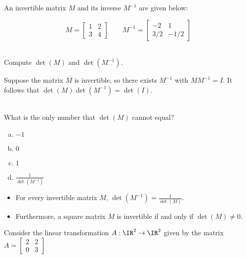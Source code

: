\begin{applicationActivities}

\begin{activity}{5}
  An invertible matrix \(M\) and its inverse \(M^{-1}\) are given below:

  \[
    M=\begin{bmatrix}1&2\\3&4\end{bmatrix}
  \hspace{2em}
    M^{-1}=\begin{bmatrix}-2&1\\3/2&-1/2\end{bmatrix}
  \]

\ \\

  Compute \(\det(M)\) and \(\det(M^{-1})\).
\end{activity}

\begin{activity}{5}
  Suppose the matrix \(M\) is invertible, so there exists \(M^{-1}\)
  with \(MM^{-1}=I\). It follows that \(\det(M)\det(M^{-1})=\det(I)\).

\ \\

  What is the only number that \(\det(M)\) cannot equal?
  \begin{multicols}{4}
  \begin{enumerate}[(a)]
  \item \(-1\)
  \item \(0\)
  \item \(1\)
  \item \(\frac{1}{\det(M^{-1})}\)
  \end{enumerate}
  \end{multicols}
\end{activity}

\begin{fact}
  \begin{itemize}
\item   For every invertible matrix \(M\),
  \(\det(M^{-1})=\frac{1}{\det(M)}\).

\item  Furthermore,
  a square matrix \(M\) is invertible if and only if \(\det(M)\not=0\).
  \end{itemize}
\end{fact}

\begin{observation}
Consider the linear transformation $A : \IR^2 \rightarrow \IR^2$ given by the matrix $A = \begin{bmatrix} 2 & 2 \\ 0 & 3 \end{bmatrix}$


\end{observation}
\end{applicationActivities}
